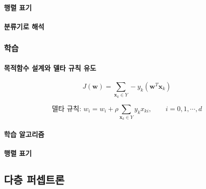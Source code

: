 \documentclass [12pt] {oblivoir}
\let\oldsubsubsection=\subsubsection
\renewcommand{\subsubsection}
{
  \filbreak
  \oldsubsubsection
}
\begin{document}
\paragraph*{행렬 표기}\mbox{}

\vspace{3mm}

\paragraph*{분류기로 해석}\mbox{}

\vspace{3mm}

\subsubsection{학습}

\paragraph*{목적함수 설계와 델타 규칙 유도}\mbox{}

\begin{equation} \tag{3.7}
  J(\mathbf{w}) = \sum_{\mathbf{x}_{k} \in Y} -y_{k}(\mathbf{w}^{T}\mathbf{x}_{k})
\end{equation}

\begin{equation} \tag{3.9}
  \text{델타 규칙: } w_{i} = w_{i} + \rho\sum_{\mathbf{x}_{k} \in Y}y_{k}x_{ki}, \qquad i = 0, 1, \cdots, d
\end{equation}

\vspace{3mm}

\paragraph*{학습 알고리즘}\mbox{}

\vspace{3mm}

\paragraph*{행렬 표기}\mbox{}

\vspace{3mm}

\subsection{다층 퍼셉트론}
\end{document}
